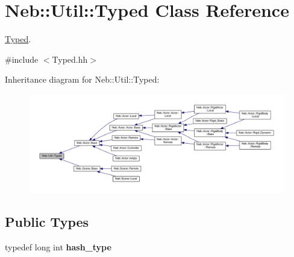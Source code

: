 \hypertarget{classNeb_1_1Util_1_1Typed}{\section{Neb\-:\-:Util\-:\-:Typed Class Reference}
\label{classNeb_1_1Util_1_1Typed}
}


\hyperlink{classNeb_1_1Util_1_1Typed}{Typed}.  




{\ttfamily \#include $<$Typed.\-hh$>$}



Inheritance diagram for Neb\-:\-:Util\-:\-:Typed\-:
\nopagebreak
\begin{figure}[H]
\begin{center}
\leavevmode
\includegraphics[width=350pt]{classNeb_1_1Util_1_1Typed__inherit__graph}
\end{center}
\end{figure}
\subsection*{Public Types}
\begin{DoxyCompactItemize}
\item 
\hypertarget{classNeb_1_1Util_1_1Typed_a9231f5f2a637c7bd3c0f310d32dc2f1f}{typedef long int {\bfseries hash\-\_\-type}}\label{classNeb_1_1Util_1_1Typed_a9231f5f2a637c7bd3c0f310d32dc2f1f}

\end{DoxyCompactItemize}
